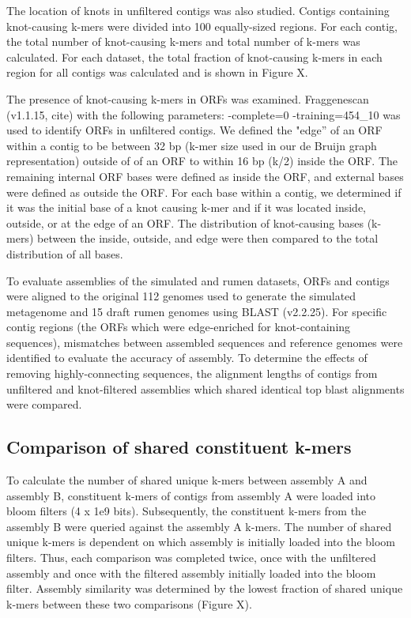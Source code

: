 \documentclass[11pt]{article} %
\begin{document}
The location of knots in unfiltered contigs was also studied. Contigs containing
knot-causing k-mers were divided into 100 equally-sized regions. For
each contig, the total number of knot-causing k-mers and total number
of k-mers was calculated. For each dataset, the total fraction of
knot-causing k-mers in each region for all contigs was calculated
and is shown in Figure X.

The presence of knot-causing k-mers in ORFs was examined. Fraggenescan
(v1.1.15, cite) with the following parameters: -complete=0 -training=454\_10
was used to identify ORFs in unfiltered contigs. We defined the "edge''
of an ORF within a contig to be between 32 bp (k-mer size used in
our de Bruijn graph representation) outside of of an ORF to within
16 bp (k/2) inside the ORF. The remaining internal ORF bases were
defined as inside the ORF, and external bases were defined as outside
the ORF. For each base within a contig, we determined if it was the
initial base of a knot causing k-mer and if it was located inside, outside,
or at the edge of an ORF. The distribution of knot-causing bases (k-mers)
between the inside, outside, and edge were then compared to the total
distribution of all bases. 

To evaluate assemblies of the simulated and rumen datasets, ORFs and contigs were aligned to the original 112 genomes used to generate the simulated metagenome and 15 draft rumen genomes  \cite{Hess:2011p686} using BLAST (v2.2.25).  For specific contig regions (the ORFs which were edge-enriched for knot-containing sequences), mismatches between assembled sequences and reference genomes were identified to evaluate the accuracy of assembly.  To determine the effects of removing highly-connecting sequences, the alignment lengths of contigs from unfiltered and knot-filtered assemblies which shared identical top blast alignments were compared.    

\subsection{Comparison of shared constituent k-mers}

To calculate the number of shared unique k-mers between assembly A and assembly B, constituent k-mers of contigs from assembly A were loaded into bloom filters (4 x 1e9 bits). Subsequently, the constituent k-mers from the assembly B were queried against
the assembly A k-mers. The number of shared unique k-mers is
dependent on which assembly is initially loaded into the bloom filters. Thus, each comparison was completed twice, once with the unfiltered
assembly and once with the filtered assembly initially loaded into the bloom
filter. Assembly similarity was determined by the lowest fraction
of shared unique k-mers between these two comparisons (Figure X). 
\end{document}

